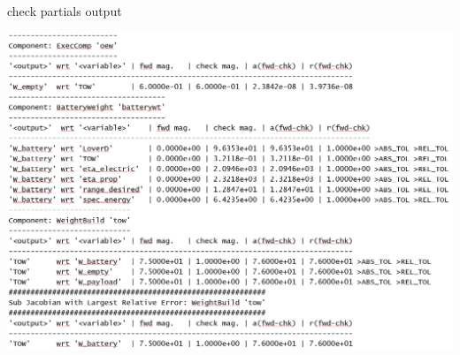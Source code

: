 \documentclass[aspectratio=169, usenames,dvipsnames, 14pt]{beamer}
\begin{document}
\begin{frame}{check partials output}

\includegraphics[scale=0.25]{images/slide_67_image.PNG}
    
\end{frame}

\end{document}
